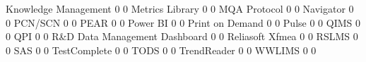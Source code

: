 \documentclass{article}
\begin{document}
\begin{Schunk}
\begin{Soutput}
  Knowledge Management                                          0            0
  Metrics Library                                               0            0
  MQA Protocol                                                  0            0
  Navigator                                                     0            0
  PCN/SCN                                                       0            0
  PEAR                                                          0            0
  Power BI                                                      0            0
  Print on Demand                                               0            0
  Pulse                                                         0            0
  QIMS                                                          0            0
  QPI                                                           0            0
  R&D Data Management Dashboard                                 0            0
  Reliasoft Xfmea                                               0            0
  RSLMS                                                         0            0
  SAS                                                           0            0
  TestComplete                                                  0            0
  TODS                                                          0            0
  TrendReader                                                   0            0
  WWLIMS                                                        0            0
                                                           

\end{Soutput}
\end{Schunk}
\end{document}
